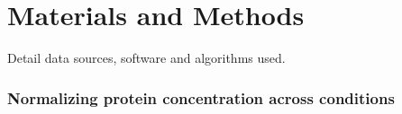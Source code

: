 \section{Materials and Methods}
Detail data sources, software and algorithms used.
\subsubsection{Normalizing protein concentration across conditions}
\label{concacrossconds} 